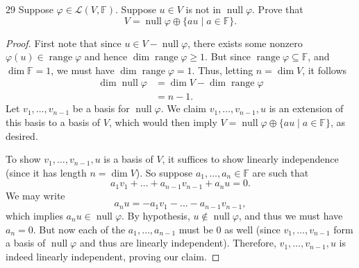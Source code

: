 \documentclass[11pt]{extarticle}
\newenvironment{problem}[1]{\begin{prob*}{#1}{}}{\end{prob*}}
\newcommand{\F}{\mathbb{F}}
\newcommand{\Hom}{\mathcal{L}}
\DeclareMathOperator{\Null}{null}
\DeclareMathOperator{\Range}{range}
\begin{document}
\begin{problem}{29}
Suppose $\varphi\in\Hom(V,\F)$.  Suppose $u\in V$ is not in $\Null\varphi$.  Prove that
\begin{equation*}
V = \Null\varphi \oplus \{au\mid a\in\F\}.
\end{equation*}
\end{problem}
\begin{proof}
First note that since $u\in V-\Null\varphi$, there exists some nonzero $\varphi(u)\in\Range\varphi$ and hence  $\dim\Range\varphi\geq 1$.  But since $\Range\varphi\subseteq\F$, and $\dim\F = 1$, we must have $\dim\Range\varphi = 1$.  Thus, letting $n= \dim V$, it follows
\begin{align*}
\dim\Null\varphi &= \dim V - \dim\Range\varphi\\
&= n - 1.
\end{align*}
Let $v_1,\dots,v_{n-1}$ be a basis for $\Null\varphi$.  We claim $v_1,\dots,v_{n-1}, u$ is an extension of this basis to a basis of $V$, which would then imply $V = \Null\varphi \oplus  \{au\mid a\in\F\}$, as desired.  
\par To show  $v_1,\dots,v_{n-1}, u$ is a basis of $V$, it suffices to show linearly independence (since it has length $n = \dim V$).  So suppose $a_1,\dots,a_n\in\F$ are such that
\begin{equation*}
a_1v_1 + \dots + a_{n-1}v_{n-1} + a_nu = 0.
\end{equation*} 
We may write
\begin{equation*}
a_nu = -a_1v_1 - \dots - a_{n-1}v_{n-1},
\end{equation*}
which implies $a_nu\in\Null \varphi$.  By hypothesis, $u\not\in\Null\varphi$, and thus we must have $a_n = 0$.  But now each of the $a_1,\dots,a_{n-1}$ must be $0$ as well (since $v_1,\dots,v_{n-1}$ form a basis of $\Null\varphi$ and thus are linearly independent).  Therefore, $v_1,\dots,v_{n-1}, u$ is indeed linearly independent, proving our claim.
\end{proof}
\end{document}
